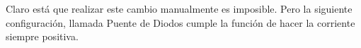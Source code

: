 \documentclass[a5paper,12pt,twoside]{book}
\begin{document}
\begin{center}
    \def\svgwidth{0.6\linewidth}
    
\end{center}

Claro está que realizar este cambio manualmente es imposible.
Pero la siguiente configuración, llamada Puente de Diodos cumple la función de hacer la corriente siempre positiva.

\begin{center}
    \def\svgwidth{0.6\linewidth}
    
\end{center}
\end{document}
